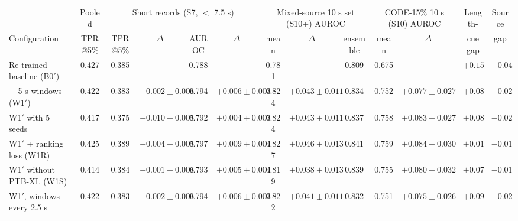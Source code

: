 \begin{tabular}{l c c c c c c c c c c c c}
\hline
 & Pooled & \multicolumn{4}{c}{Short records (S7, $<$ 7.5 s)} & \multicolumn{3}{c}{Mixed-source 10 s set (S10+) AUROC} & \multicolumn{2}{c}{CODE-15\% 10 s (S10) AUROC} & Length- & Source \\
Configuration & TPR@5\% & TPR@5\% & $\Delta$ & AUROC & $\Delta$ & mean & $\Delta$ & ensemble & mean & $\Delta$ & cue gap & gap \\
\hline
Re-trained baseline (B0$'$) & 0.427 & 0.385 & -- & 0.788 & -- & 0.781 & -- & 0.809 & 0.675 & -- & $+0.15$ & $-0.04$ \\
+ 5 s windows (W1$'$) & 0.422 & 0.383 & $-0.002 \pm 0.006$ & 0.794 & $+0.006 \pm 0.003$ & 0.824 & $+0.043 \pm 0.011$ & 0.834 & 0.752 & $+0.077 \pm 0.027$ & $+0.08$ & $-0.02$ \\
\quad W1$'$ with 5 seeds & 0.417 & 0.375 & $-0.010 \pm 0.005$ & 0.792 & $+0.004 \pm 0.003$ & 0.824 & $+0.043 \pm 0.011$ & 0.837 & 0.758 & $+0.083 \pm 0.027$ & $+0.08$ & $-0.02$ \\
W1$'$ + ranking loss (W1R) & 0.425 & 0.389 & $+0.004 \pm 0.005$ & 0.797 & $+0.009 \pm 0.004$ & 0.827 & $+0.046 \pm 0.013$ & 0.841 & 0.759 & $+0.084 \pm 0.030$ & $+0.01$ & $-0.01$ \\
W1$'$ without PTB-XL (W1S) & 0.414 & 0.384 & $-0.001 \pm 0.006$ & 0.793 & $+0.005 \pm 0.004$ & 0.819 & $+0.038 \pm 0.013$ & 0.839 & 0.755 & $+0.080 \pm 0.032$ & $+0.07$ & $-0.01$ \\
\quad W1$'$, windows every 2.5 s & 0.422 & 0.383 & $-0.002 \pm 0.006$ & 0.794 & $+0.006 \pm 0.003$ & 0.822 & $+0.041 \pm 0.011$ & 0.832 & 0.751 & $+0.075 \pm 0.026$ & $+0.09$ & $-0.02$ \\
\hline
\end{tabular}
